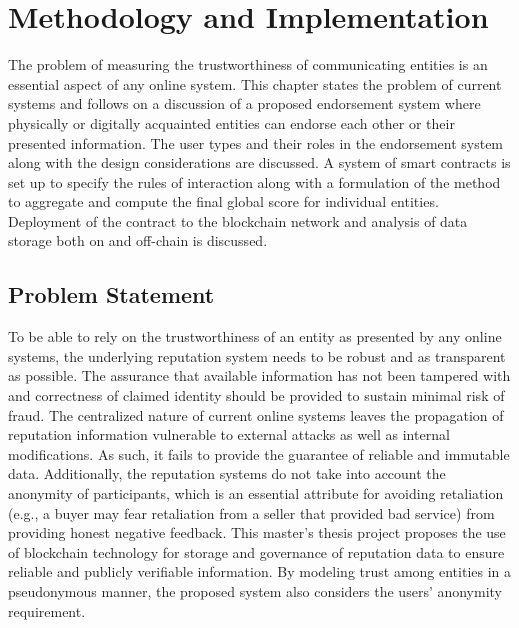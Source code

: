 \chapter{Methodology and Implementation} \label{ch:method}
The problem of measuring the trustworthiness of communicating entities is an
essential aspect of any online system. This chapter states the problem of
current systems and follows on a discussion of a proposed endorsement system
where physically or digitally acquainted entities can endorse each other or
their presented information. The user types and their roles in the endorsement
system along with the design considerations are discussed. A system of smart
contracts is set up to specify the rules of interaction along with a
formulation of the method to aggregate and compute the final global score for
individual entities. Deployment of the contract to the blockchain network and
analysis of data storage both on and off-chain is discussed. 

\section{Problem Statement}
To be able to rely on the trustworthiness of an entity as presented by any
online systems, the underlying reputation system needs to be robust and as
transparent as possible. The assurance that available information has not been
tampered with and correctness of claimed identity should be provided to sustain
minimal risk of fraud. The centralized nature of current online systems leaves
the propagation of reputation information vulnerable to external attacks as
well as internal modifications. As such, it fails to provide the guarantee of
reliable and immutable data. Additionally, the reputation systems do not take
into account the anonymity of participants, which is an essential attribute for
avoiding retaliation (e.g., a buyer may fear retaliation from a seller that
provided bad service) from providing honest negative feedback. This master's
thesis project proposes the use of blockchain technology for storage and
governance of reputation data to ensure reliable and publicly verifiable
information. By modeling trust among entities in a pseudonymous manner, the
proposed system also considers the users' anonymity requirement. 

